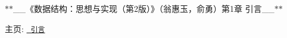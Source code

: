 $\ast$$\ast$\+\_\+\+\_\+《数据结构：思想与实现（第2版）》（翁惠玉，俞勇）第1章 引言\+\_\+\+\_\+$\ast$$\ast$

主页\+: \href{https://grwei.github.io/data-structure-homework/DS_Ch1/doc/html/index.html}{\texttt{ 引言}} 